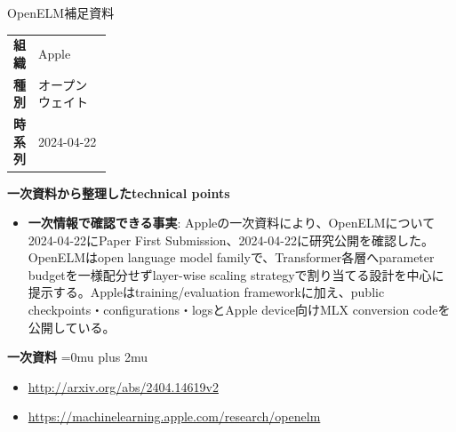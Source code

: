 \Needspace{0.38\textheight}
\begin{technicalnote}{OpenELM}{補足資料}
\begingroup
\begin{tabularx}{\linewidth}{@{}>{\bfseries}p{0.22\linewidth}X@{}}
組織 & Apple \\
種別 & オープンウェイト \\
時系列 & 2024-04-22 \\
\end{tabularx}
\smallskip
\begin{minipage}{\linewidth}
{\bfseries 一次資料から整理したtechnical points}
\begin{itemize}[leftmargin=1.5em,itemsep=0.35em]
\item \textbf{一次情報で確認できる事実}: Appleの一次資料により、OpenELMについて2024-04-22にPaper First Submission、2024-04-22に研究公開を確認した。 OpenELMはopen language model familyで、Transformer各層へparameter budgetを一様配分せずlayer-wise scaling strategyで割り当てる設計を中心に提示する。Appleはtraining/evaluation frameworkに加え、public checkpoints・configurations・logsとApple device向けMLX conversion codeを公開している。
\end{itemize}
\begin{minipage}{\linewidth}
\begin{samepage}
{\bfseries 一次資料}
\begingroup\sloppy
\Urlmuskip=0mu plus 2mu\relax
\begin{itemize}[leftmargin=1.5em,itemsep=0.25em]
\item {\scriptsize\url{http://arxiv.org/abs/2404.14619v2}}
\item {\scriptsize\url{https://machinelearning.apple.com/research/openelm}}
\end{itemize}
\endgroup
\end{samepage}
\end{minipage}
\end{minipage}
\endgroup
\end{technicalnote}
\medskip
